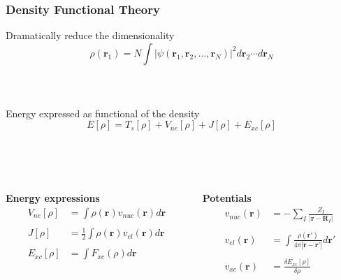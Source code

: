 \documentclass[mathserif, 8pt]{beamer}
\begin{document}
\begin{frame}
    \frametitle{Density Functional Theory}
    \centering
    Dramatically reduce the dimensionality
    \begin{equation}
	\nonumber
	\rho(\boldsymbol{r}_1) = N \int |\psi(\boldsymbol{r}_1, \boldsymbol{r}_2,\dots,
	\boldsymbol{r}_N)|^2 d\boldsymbol{r}_2\cdots d\boldsymbol{r}_N
    \end{equation}
    \ \\
    \ \\
    \ \\
    \pause
    Energy expressed as functional of the density
    \begin{equation}
	\nonumber
	E[\rho] = T_s[\rho] + V_{ne}[\rho] + J[\rho] + E_{xc}[\rho]
    \end{equation}
    \ \\
    \ \\
    \ \\
    \begin{columns}
    \begin{column}{.50\textwidth}
    \centering
    \pause
    \textbf{Energy expressions}
    \begin{align}
	\nonumber
	V_{ne}[\rho]	&= \int \rho(\boldsymbol{r})v_{nuc}(\boldsymbol{r})d\boldsymbol{r}\\
	\nonumber
			&\\
	\nonumber
	J[\rho] &= \frac{1}{2} \int \rho(\boldsymbol{r})v_{el}(\boldsymbol{r})d\boldsymbol{r}\\
	\nonumber
			&\\
	\nonumber
	E_{xc}[\rho]	&= \int F_{xc}(\rho) d\boldsymbol{r}
    \end{align}
    \end{column}
    \begin{column}{.50\textwidth}
    \centering
    \pause
    \textbf{Potentials}
    \begin{align}
	\nonumber
	v_{nuc}(\boldsymbol{r}) &= -\sum_I\frac{Z_I}{|\boldsymbol{r}-\boldsymbol{R}_I|}\\
	\nonumber
			&\\
	\nonumber
	v_{el}(\boldsymbol{r}) &= 
	    \int \frac{\rho(\boldsymbol{r}')}{4\pi|\boldsymbol{r}-\boldsymbol{r}'|} d\boldsymbol{r}'\\
	\nonumber
			&\\
	\nonumber
	v_{xc}(\boldsymbol{r}) &= \frac{\delta E_{xc}[\rho]}{\delta\rho}
    \end{align}
    \end{column}
    \end{columns}    
\end{frame}
\end{document}
